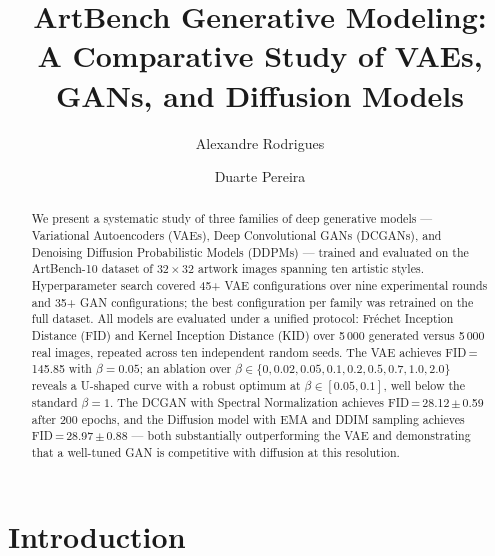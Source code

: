 \documentclass[runningheads]{llncs}
\begin{document}
\title{ArtBench Generative Modeling:\texorpdfstring{\\}{ }A Comparative Study of VAEs, GANs, and Diffusion Models}

\author{Alexandre Rodrigues \and
Duarte Pereira}



\maketitle

\begin{abstract}
We present a systematic study of three families of deep generative models
--- Variational Autoencoders (VAEs), Deep Convolutional GANs (DCGANs), and
Denoising Diffusion Probabilistic Models (DDPMs) --- trained and evaluated on
the ArtBench-10 dataset of $32{\times}32$ artwork images spanning ten artistic
styles. Hyperparameter search covered 45+ VAE configurations over nine
experimental rounds and 35+ GAN configurations; the best configuration per
family was retrained on the full dataset.
All models are evaluated under a unified protocol: Fr\'{e}chet Inception
Distance (FID) and Kernel Inception Distance (KID) over 5\,000 generated
versus 5\,000 real images, repeated across ten independent random seeds.
The VAE achieves FID\,=\,145.85 with $\beta=0.05$; an ablation over
$\beta\in\{0,0.02,0.05,0.1,0.2,0.5,0.7,1.0,2.0\}$ reveals a U-shaped curve
with a robust optimum at $\beta\in[0.05,0.1]$, well below the standard
$\beta=1$. The DCGAN with Spectral Normalization achieves FID\,=\,28.12\,$\pm$\,0.59
after 200 epochs, and the Diffusion model with EMA and DDIM sampling achieves
FID\,=\,28.97\,$\pm$\,0.88 --- both substantially outperforming the VAE and
demonstrating that a well-tuned GAN is competitive with diffusion at this
resolution.
\end{abstract}

\section{Introduction}
\end{document}
